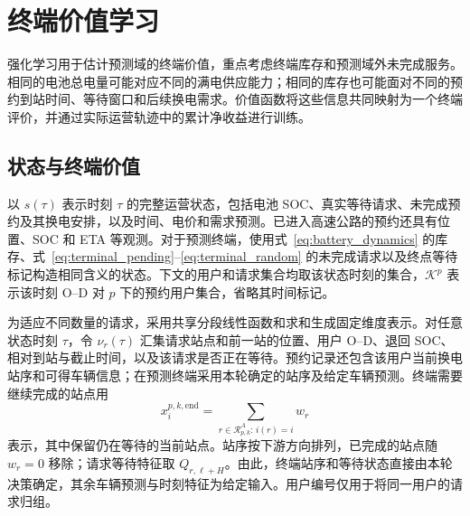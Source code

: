 \documentclass[12pt,a4paper,UTF8]{ctexart}
\numberwithin{equation}{section}
\newcommand{\R}{\mathcal R}
\begin{document}
\section{终端价值学习}
\label{sec:value}

强化学习用于估计预测域的终端价值，重点考虑终端库存和预测域外未完成服务。相同的电池总电量可能对应不同的满电供应能力；相同的库存也可能面对不同的预约到站时间、等待窗口和后续换电需求。价值函数将这些信息共同映射为一个终端评价，并通过实际运营轨迹中的累计净收益进行训练。

\subsection{状态与终端价值}
\label{sec:value_state}

以 $s(\tau)$ 表示时刻 $\tau$ 的完整运营状态，包括电池 SOC、真实等待请求、未完成预约及其换电安排，以及时间、电价和需求预测。已进入高速公路的预约还具有位置、SOC 和 ETA 等观测。对于预测终端，使用式~\eqref{eq:battery_dynamics} 的库存、式~\eqref{eq:terminal_pending}--\eqref{eq:terminal_random} 的未完成请求以及终点等待标记构造相同含义的状态。下文的用户和请求集合均取该状态时刻的集合，$\mathcal K^p$ 表示该时刻 O--D 对 $p$ 下的预约用户集合，省略其时间标记。

为适应不同数量的请求，采用共享分段线性函数和求和生成固定维度表示。对任意状态时刻 $\tau$，令 $\nu_r(\tau)$ 汇集请求站点和前一站的位置、用户 O--D、退回 SOC、相对到站与截止时间，以及该请求是否正在等待。预约记录还包含该用户当前换电站序和可得车辆信息；在预测终端采用本轮确定的站序及给定车辆预测。终端需要继续完成的站点用
\begin{equation}
x_i^{p,k,\mathrm{end}}=\sum_{r\in\R_{p,k}^A:\,i(r)=i}w_r
\label{eq:terminal_visits}
\end{equation}
表示，其中保留仍在等待的当前站点。站序按下游方向排列，已完成的站点随 $w_r=0$ 移除；请求等待特征取 $Q_{r,\ell+H}$。由此，终端站序和等待状态直接由本轮决策确定，其余车辆预测与时刻特征为给定输入。用户编号仅用于将同一用户的请求归组。
\end{document}
